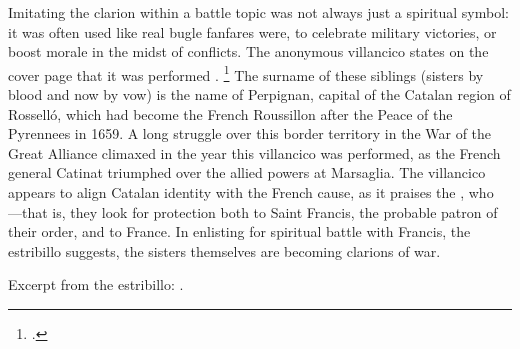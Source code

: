 Imitating the clarion within a battle topic was not always just a spiritual
symbol: it was often used like real bugle fanfares were, to celebrate military
victories, or boost morale in the midst of conflicts.%
    \Autocite[288--294]{Illari:Polychoral}
The anonymous villancico  states on the cover
page that it was performed .%
    \footnote{.}
The surname of these siblings (sisters by blood and now by vow) is the name of
Perpignan, capital of the Catalan region of Rosselló, which had become the
French Roussillon after the Peace of the Pyrennees in 1659.
A long struggle over this border territory in the War of the Great Alliance
climaxed in the year this villancico was performed, as the French general
Catinat triumphed over the allied powers at Marsaglia.
The villancico appears to align Catalan identity with the French cause, as it
praises the , who
---that is,
they look for protection both to Saint Francis, the probable patron of their
order, and to France.
In enlisting for spiritual battle with Francis, the estribillo suggests, the
sisters themselves are becoming clarions of war.%
\begin{Footnote}
    Excerpt from the estribillo: 
    .
\end{Footnote}


